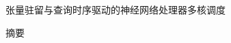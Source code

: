 \newif\ifcontest
\contestfalse


\begin{center}{\heiti{}张量驻留与查询时序驱动的神经网络处理器多核调度}\par\vspace{1em}摘\quad 要\end{center}



